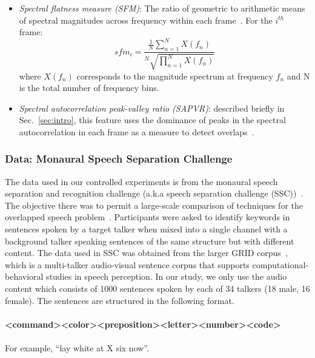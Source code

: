 {\begin{itemize}
\begin{equation}
\label{eq:kurtosis}
k_x = \frac{E\{x^4\}}{(E\{x^2\})^2}
\end{equation}
\vspace{1mm}
In this case $x$ refers to speech samples in a given frame. 
  \item {\it Spectral flatness measure (SFM)}: The ratio of geometric to arithmetic means of spectral magnitudes across frequency within each frame~\cite{nav_icassp13}. For the $i^{th}$ frame:
\begin{equation}
\label{eq:kurtosis}
sfm_i = \frac{\frac{1}{N}\sum_{n=1}^{N}{X(f_n)}}{^N\sqrt{\prod_{n=1}^{N}{X(f_n)}}}
\end{equation}
\vspace{1mm}
where $X(f_n)$ corresponds to the magnitude spectrum at frequency $f_n$ and {N} is the total number of frequency bins. 
  \item {\it Spectral autocorrelation peak-valley ratio (SAPVR)}: described briefly in Sec.~\ref{sec:intro}, this feature uses the dominance of peaks in the spectral autocorrelation in each frame as a measure to detect overlaps~\cite{sapvr_2000}. 
\end{itemize}

\subsubsection{Data: Monaural Speech Separation Challenge}

The data used in our controlled experiments is from the monaural speech separation and recognition challenge (a.k.a speech separation challenge (SSC))~\cite{cooke20101}. 
The objective there was to permit a large-scale comparison of techniques for the overlapped speech problem~\cite{cooke20101}. 
Participants were asked to identify keywords in sentences spoken by a target talker when mixed into a single channel with a background talker speaking sentences of the same structure but with different content. 
The data used in SSC was obtained from the larger GRID corpus~\cite{cooke_JASA_SSCD}, which is a multi-talker audio-visual sentence corpus that supports computational-behavioral studies in speech perception. 
In our study, we only use the audio content which consists of 1000 sentences spoken by each of 34 talkers (18 male, 16 female). The sentences are structured in the following format.
\\\\
{\small \bf \textless command\textgreater\textless color\textgreater\textless preposition\textgreater\textless letter\textgreater\textless number\textgreater\textless code\textgreater}
\\\\
For example, ``lay white at X six now''.

}
